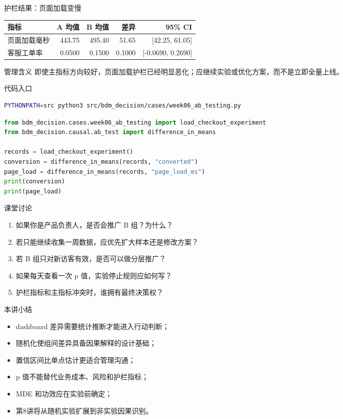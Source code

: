 \documentclass[UTF8,fontset=fandol,aspectratio=169,11pt]{ctexbeamer}
\begin{document}
\begin{frame}{护栏结果：页面加载变慢}
\begin{center}
\begin{tabular}{lrrrr}
\toprule
指标 & A 均值 & B 均值 & 差异 & 95\% CI\\
\midrule
页面加载毫秒 & 443.75 & 495.40 & 51.65 & [42.25, 61.05]\\
客服工单率 & 0.0500 & 0.1500 & 0.1000 & [-0.0690, 0.2690]\\
\bottomrule
\end{tabular}
\end{center}
\vspace{0.25cm}
\begin{block}{管理含义}
即使主指标方向较好，页面加载护栏已经明显恶化；应继续实验或优化方案，而不是立即全量上线。
\end{block}
\end{frame}

\begin{frame}[fragile]{代码入口}
\begin{lstlisting}[language=bash]
PYTHONPATH=src python3 src/bdm_decision/cases/week06_ab_testing.py
\end{lstlisting}

\begin{lstlisting}[language=Python]
from bdm_decision.cases.week06_ab_testing import load_checkout_experiment
from bdm_decision.causal.ab_test import difference_in_means

records = load_checkout_experiment()
conversion = difference_in_means(records, "converted")
page_load = difference_in_means(records, "page_load_ms")
print(conversion)
print(page_load)
\end{lstlisting}
\end{frame}

\begin{frame}{课堂讨论}
\begin{enumerate}
  \item 如果你是产品负责人，是否会推广 B 组？为什么？
  \item 若只能继续收集一周数据，应优先扩大样本还是修改方案？
  \item 若 B 组只对新访客有效，是否可以做分层推广？
  \item 如果每天查看一次 p 值，实验停止规则应如何写？
  \item 护栏指标和主指标冲突时，谁拥有最终决策权？
\end{enumerate}
\end{frame}

\begin{frame}{本讲小结}
\begin{itemize}
  \item dashboard 差异需要统计推断才能进入行动判断；
  \item 随机化使组间差异具备因果解释的设计基础；
  \item 置信区间比单点估计更适合管理沟通；
  \item p 值不能替代业务成本、风险和护栏指标；
  \item MDE 和功效应在实验前确定；
  \item 第8讲将从随机实验扩展到非实验因果识别。
\end{itemize}
\end{frame}
\end{document}
